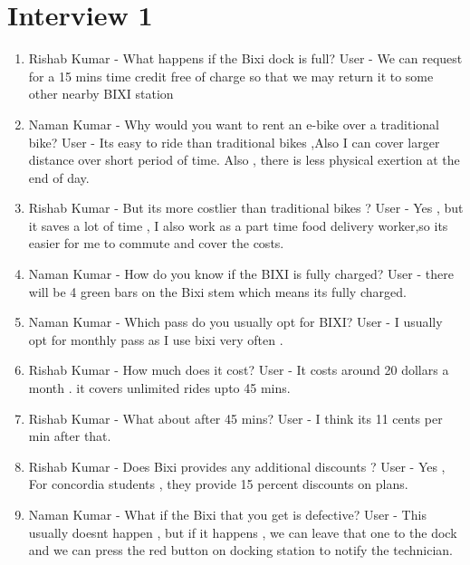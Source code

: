 \section{Interview 1}
\begin{enumerate}
    \item Rishab Kumar - What happens if the Bixi dock is full?
    \newline User - We can request for a 15 mins time credit free of charge so that we may return it to some other nearby BIXI station
    \item Naman Kumar - Why would you want to rent an e-bike over a traditional bike?
    \newline User - Its easy to ride than traditional bikes ,Also I can cover larger distance over short period of time. Also , there is less physical exertion at the end of day. 
    \item Rishab Kumar - But its more costlier than traditional bikes ?
    \newline User - Yes , but it saves a lot of time , I also work as a part time food delivery worker,so its   easier for me to commute and cover the costs.
    \item Naman Kumar - How do you know if the BIXI is fully charged?
    \newline User - there will be 4 green bars on the Bixi stem which means its fully charged.
    \item Naman Kumar - Which pass do you usually opt for BIXI?
    \newline User - I usually opt for monthly pass as I use bixi very often . 
    \item Rishab Kumar - How much does it cost?
    \newline User - It costs around 20 dollars a month . it covers unlimited rides upto 45 mins.
    \item Rishab Kumar - What about after 45 mins?
    \newline User - I think its 11 cents per min after that.
    \item Rishab Kumar - Does Bixi provides any additional discounts ?
    \newline User - Yes , For concordia students , they provide 15 percent discounts on plans. 
    \item Naman Kumar - What if the Bixi that you get is defective?
    \newline User - This usually doesnt happen , but if it happens , we can leave that one to the dock and we can press the red button on docking station to notify the technician.
\end{enumerate}






